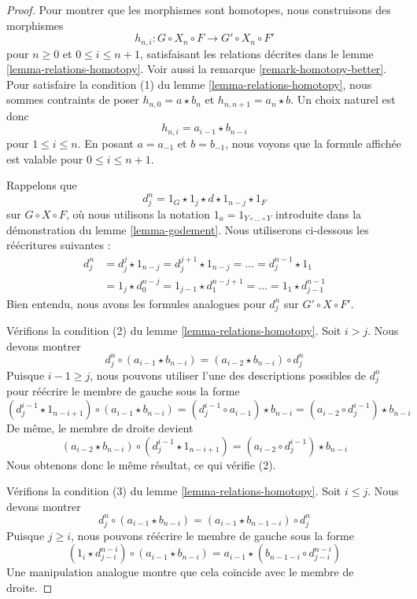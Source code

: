 \begin{proof}
Pour montrer que les morphismes sont homotopes, nous construisons des morphismes
$$
h_{n, i} : G \circ X_n \circ F \to G' \circ X_n \circ F'
$$
pour $n \geq 0$ et $0 \leq i \leq n + 1$, satisfaisant les relations décrites
dans le lemme \ref{lemma-relations-homotopy}. Voir aussi la remarque
\ref{remark-homotopy-better}. Pour satisfaire la condition (1) du lemme
\ref{lemma-relations-homotopy}, nous sommes contraints de poser
$h_{n, 0} = a \star b_n$ et $h_{n , n + 1} = a_n \star b$.
Un choix naturel est donc
$$
h_{n , i} = a_{i - 1} \star b_{n - i}
$$
pour $1 \leq i \leq n$. En posant $a = a_{-1}$ et $b = b_{-1}$, nous voyons
que la formule affichée est valable pour $0 \leq i \leq n + 1$.

\medskip\noindent
Rappelons que
$$
d^n_j = 1_G \star 1_j \star d \star 1_{n - j} \star 1_F
$$
sur $G \circ X \circ F$, où nous utilisons la notation
$1_a = 1_{Y \circ \ldots \circ Y}$ introduite dans la démonstration du lemme
\ref{lemma-godement}. Nous utiliserons ci-dessous les réécritures suivantes :
\begin{align*}
d^n_j
& =
d^j_j \star 1_{n - j} =
d^{j + 1}_j \star 1_{n - j} = \ldots = d^{n - 1}_j \star 1_1 \\
& =
1_j \star d^{n - j}_0 = 1_{j - 1} \star d^{n - j + 1}_1 = \ldots =
1_1 \star d^{n - 1}_{j - 1}
\end{align*}
Bien entendu, nous avons les formules analogues pour $d^n_j$ sur
$G' \circ X \circ F'$.

\medskip\noindent
Vérifions la condition (2) du lemme \ref{lemma-relations-homotopy}.
Soit $i > j$. Nous devons montrer
$$
d^n_j \circ (a_{i - 1} \star b_{n - i}) =
(a_{i - 2} \star b_{n - i}) \circ d^n_j
$$
Puisque $i - 1 \geq j$, nous pouvons utiliser l'une des descriptions possibles
de $d^n_j$ pour réécrire le membre de gauche sous la forme
$$
(d^{i - 1}_j \star 1_{n - i + 1}) \circ (a_{i - 1} \star b_{n - i}) =
(d^{i - 1}_j \circ a_{i - 1}) \star b_{n - i} =
(a_{i - 2} \circ d^{i - 1}_j) \star b_{n - i}
$$
De même, le membre de droite devient
$$
(a_{i - 2} \star b_{n - i}) \circ (d^{i - 1}_j \star 1_{n - i + 1}) =
(a_{i - 2} \circ d^{i - 1}_j) \star b_{n - i}
$$
Nous obtenons donc le même résultat, ce qui vérifie (2).

\medskip\noindent
Vérifions la condition (3) du lemme \ref{lemma-relations-homotopy}.
Soit $i \leq j$. Nous devons montrer
$$
d^n_j \circ (a_{i - 1} \star b_{n - i}) =
(a_{i - 1} \star b_{n - 1 - i}) \circ d^n_j
$$
Puisque $j \geq i$, nous pouvons réécrire le membre de gauche sous la forme
$$
(1_i \star d^{n - i}_{j - i}) \circ (a_{i - 1} \star b_{n - i}) =
a_{i - 1} \star (b_{n - 1 - i} \circ d^{n - i}_{j - i})
$$
Une manipulation analogue montre que cela coïncide avec le membre de droite.


\end{proof}
